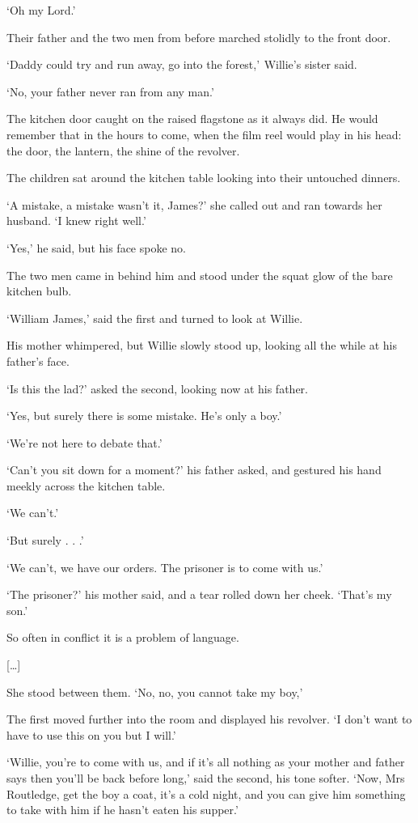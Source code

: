 \documentclass[10pt,a4paper]{article}
\begin{document}
‘Oh my Lord.’

Their father and the two men from before marched stolidly to the front door.

‘Daddy could try and run away, go into the forest,’  Willie’s sister said.

‘No, your father never ran from any man.’

The kitchen door caught on the raised flagstone as it always did. He would remember that in the hours to come, when the film reel would play in his head: the door, the lantern, the shine of the revolver.

The children sat around the kitchen table looking into their untouched dinners.

‘A mistake, a mistake wasn’t it, James?’ she called out and ran towards her husband. ‘I knew right well.’

‘Yes,’ he said, but his face spoke no.

The two men came in behind him and stood under the squat glow of the bare kitchen bulb.

‘William James,’ said the first and turned to look at Willie.

His mother whimpered, but Willie slowly stood up, looking all the while at his father’s face.

‘Is this the lad?’ asked the second, looking now at his father.

‘Yes, but surely there is some mistake. He’s only a boy.’

‘We’re not here to debate that.’

‘Can’t you sit down for a moment?’ his father asked, and gestured his hand meekly across the kitchen table.

‘We can’t.’

‘But surely . . .’

‘We can’t, we have our orders. The prisoner is to come with us.’

‘The prisoner?’ his mother said, and a tear rolled down her cheek. ‘That’s my son.’

So often in conflict it is a problem of language.

[…]

She stood between them. ‘No, no, you cannot take my boy,’

The first moved further into the room and displayed his revolver. ‘I don’t want to have to use this on you but I will.’

‘Willie, you’re to come with us, and if it’s all nothing as your mother and father says then you’ll be back before long,’ said the second, his tone softer. ‘Now, Mrs Routledge, get the boy a coat, it’s a cold night, and you can give him something to take with him if he hasn’t eaten his supper.’
\end{document}
